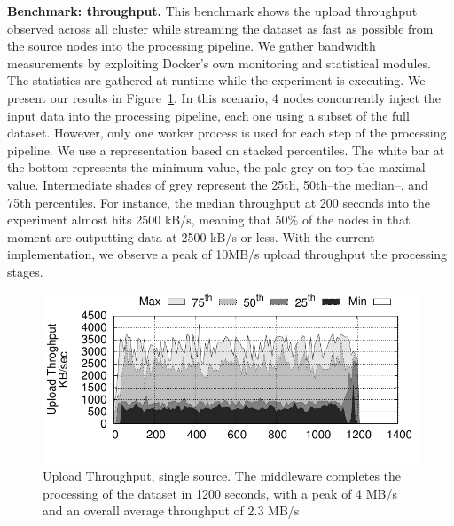 \textbf{Benchmark: throughput.} This benchmark shows the upload throughput observed across all cluster while streaming the dataset as fast as possible from the source nodes into the processing pipeline.
We gather bandwidth measurements by exploiting Docker's own monitoring and statistical modules.
The statistics are gathered at runtime while the experiment is executing.
We present our results in Figure~\ref{fig:throughput}.
In this scenario, 4 nodes concurrently inject the input data into the processing pipeline, each one using a subset of the full dataset.
However, only one worker process is used for each step of the processing pipeline.
We use a representation based on stacked percentiles. 
The white bar at the bottom represents the minimum value, the pale grey on top the maximal value. 
Intermediate shades of grey represent the 25th, 50th–the median–, and 75th percentiles. 
For instance, the median throughput at 200 seconds into the experiment almost hits 2500 kB/s, meaning that 50\% of the nodes in that moment are outputting data at 2500 kB/s or less.
With the current implementation, we observe a peak of 10MB/s upload throughput the processing stages.%


\begin{figure}[t!]
  \centering
  \includegraphics[scale=0.7]{../../experiment/results/throughput/outputs/tput_upload_4-datas-1-worker.pdf}
  \caption{Upload Throughput, single source. The middleware completes the processing of the dataset in 1200 seconds, with a peak of 4 MB/s and an overall average throughput of 2.3 MB/s}
  \label{fig:throughput}
\end{figure}

